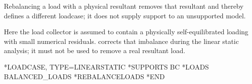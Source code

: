 Rebalancing a load with a physical resultant removes that resultant and thereby defines a different loadcase; it does not supply support to an unsupported model.

Here the load collector  is assumed to
contain a physically self-equilibrated loading with small
numerical residuals.  corrects that imbalance
during the linear static analysis; it must not be used to
remove a real resultant load.

\exampleheading
\begin{inputdeck}
*LOADCASE, TYPE=LINEARSTATIC
*SUPPORTS
BC
*LOADS
BALANCED_LOADS
*REBALANCELOADS
*END
\end{inputdeck}
